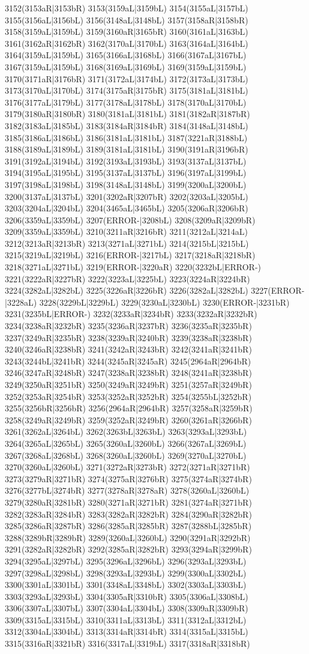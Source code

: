 3152(3153aR|3153bR) 3153(3159aL|3159bL) 3154(3155aL|3157bL) 3155(3156aL|3156bL) 3156(3148aL|3148bL) 3157(3158aR|3158bR) 3158(3159aL|3159bL) 3159(3160aR|3165bR) 3160(3161aL|3163bL) 3161(3162aR|3162bR) 3162(3170aL|3170bL) 3163(3164aL|3164bL) 3164(3159aL|3159bL) 3165(3166aL|3168bL) 3166(3167aL|3167bL) 3167(3159aL|3159bL) 3168(3169aL|3169bL) 3169(3159aL|3159bL) 3170(3171aR|3176bR) 3171(3172aL|3174bL) 3172(3173aL|3173bL) 3173(3170aL|3170bL) 3174(3175aR|3175bR) 3175(3181aL|3181bL) 3176(3177aL|3179bL) 3177(3178aL|3178bL) 3178(3170aL|3170bL) 3179(3180aR|3180bR) 3180(3181aL|3181bL) 3181(3182aR|3187bR) 3182(3183aL|3185bL) 3183(3184aR|3184bR) 3184(3148aL|3148bL) 3185(3186aL|3186bL) 3186(3181aL|3181bL) 3187(3221aR|3188bL) 3188(3189aL|3189bL) 3189(3181aL|3181bL) 3190(3191aR|3196bR) 3191(3192aL|3194bL) 3192(3193aL|3193bL) 3193(3137aL|3137bL) 3194(3195aL|3195bL) 3195(3137aL|3137bL) 3196(3197aL|3199bL) 3197(3198aL|3198bL) 3198(3148aL|3148bL) 3199(3200aL|3200bL) 3200(3137aL|3137bL) 3201(3202aR|3207bR) 3202(3203aL|3205bL) 3203(3204aL|3204bL) 3204(3465aL|3465bL) 3205(3206aR|3206bR) 3206(3359aL|3359bL) 3207(ERROR-|3208bL) 3208(3209aR|3209bR) 3209(3359aL|3359bL) 3210(3211aR|3216bR) 3211(3212aL|3214aL) 3212(3213aR|3213bR) 3213(3271aL|3271bL) 3214(3215bL|3215bL) 3215(3219aL|3219bL) 3216(ERROR-|3217bL) 3217(3218aR|3218bR) 3218(3271aL|3271bL) 3219(ERROR-|3220aR) 3220(3232bL|ERROR-) 3221(3222aR|3227bR) 3222(3223aL|3225bL) 3223(3224aR|3224bR) 3224(3282aL|3282bL) 3225(3226aR|3226bR) 3226(3282aL|3282bL) 3227(ERROR-|3228aL) 3228(3229bL|3229bL) 3229(3230aL|3230bL) 3230(ERROR-|3231bR) 3231(3235bL|ERROR-) 3232(3233aR|3234bR) 3233(3232aR|3232bR) 3234(3238aR|3232bR) 3235(3236aR|3237bR) 3236(3235aR|3235bR) 3237(3249aR|3235bR) 3238(3239aR|3240bR) 3239(3238aR|3238bR) 3240(3246aR|3238bR) 3241(3242aR|3243bR) 3242(3241aR|3241bR) 3243(3244bL|3241bR) 3244(3245aR|3245aR) 3245(2964aR|2964bR) 3246(3247aR|3248bR) 3247(3238aR|3238bR) 3248(3241aR|3238bR) 3249(3250aR|3251bR) 3250(3249aR|3249bR) 3251(3257aR|3249bR) 3252(3253aR|3254bR) 3253(3252aR|3252bR) 3254(3255bL|3252bR) 3255(3256bR|3256bR) 3256(2964aR|2964bR) 3257(3258aR|3259bR) 3258(3249aR|3249bR) 3259(3252aR|3249bR) 3260(3261aR|3266bR) 3261(3262aL|3264bL) 3262(3263bL|3263bL) 3263(3293aL|3293bL) 3264(3265aL|3265bL) 3265(3260aL|3260bL) 3266(3267aL|3269bL) 3267(3268aL|3268bL) 3268(3260aL|3260bL) 3269(3270aL|3270bL) 3270(3260aL|3260bL) 3271(3272aR|3273bR) 3272(3271aR|3271bR) 3273(3279aR|3271bR) 3274(3275aR|3276bR) 3275(3274aR|3274bR) 3276(3277bL|3274bR) 3277(3278aR|3278aR) 3278(3260aL|3260bL) 3279(3280aR|3281bR) 3280(3271aR|3271bR) 3281(3274aR|3271bR) 3282(3283aR|3284bR) 3283(3282aR|3282bR) 3284(3290aR|3282bR) 3285(3286aR|3287bR) 3286(3285aR|3285bR) 3287(3288bL|3285bR) 3288(3289bR|3289bR) 3289(3260aL|3260bL) 3290(3291aR|3292bR) 3291(3282aR|3282bR) 3292(3285aR|3282bR) 3293(3294aR|3299bR) 3294(3295aL|3297bL) 3295(3296aL|3296bL) 3296(3293aL|3293bL) 3297(3298aL|3298bL) 3298(3293aL|3293bL) 3299(3300aL|3302bL) 3300(3301aL|3301bL) 3301(3348aL|3348bL) 3302(3303aL|3303bL) 3303(3293aL|3293bL) 3304(3305aR|3310bR) 3305(3306aL|3308bL) 3306(3307aL|3307bL) 3307(3304aL|3304bL) 3308(3309aR|3309bR) 3309(3315aL|3315bL) 3310(3311aL|3313bL) 3311(3312aL|3312bL) 3312(3304aL|3304bL) 3313(3314aR|3314bR) 3314(3315aL|3315bL) 3315(3316aR|3321bR) 3316(3317aL|3319bL) 3317(3318aR|3318bR) 